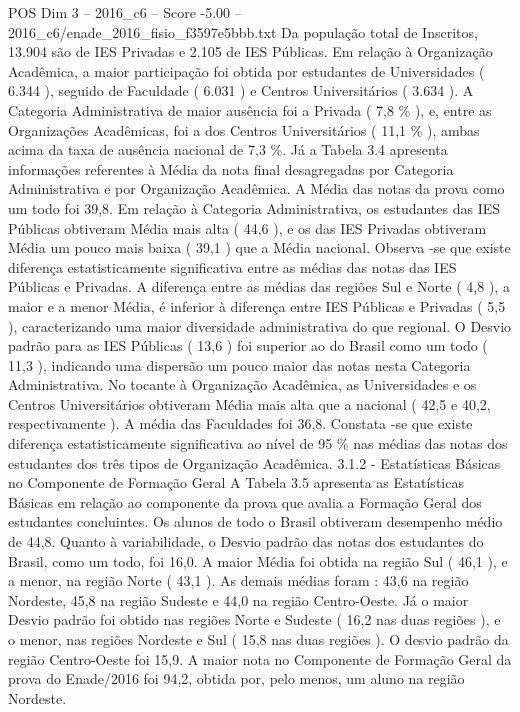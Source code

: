 \begin{textsample}{POS Dim 3 – 2016\_c6 – Score -5.00 – 2016\_c6/enade\_2016\_fisio\_f3597e5bbb.txt}
Da população total de Inscritos, 13.904 são de IES Privadas e 2.105 de IES Públicas.
Em relação à Organização Acadêmica, a maior participação foi obtida por estudantes de Universidades ( 6.344 ), seguido de Faculdade ( 6.031 ) e Centros Universitários ( 3.634 ).
A Categoria Administrativa de maior ausência foi a Privada ( 7,8 \% ), e, entre as Organizações Acadêmicas, foi a dos Centros Universitários ( 11,1 \% ), ambas acima da taxa de ausência nacional de 7,3 \%.
Já a Tabela 3.4 apresenta informações referentes à Média da nota final desagregadas por Categoria Administrativa e por Organização Acadêmica.
A Média das notas da prova como um todo foi 39,8.
Em relação à Categoria Administrativa, os estudantes das IES Públicas obtiveram Média mais alta ( 44,6 ), e os das IES Privadas obtiveram Média um pouco mais baixa ( 39,1 ) que a Média nacional.
Observa -se que existe diferença estatisticamente significativa entre as médias das notas das IES Públicas e Privadas.
A diferença entre as médias das regiões Sul e Norte ( 4,8 ), a maior e a menor Média, é inferior à diferença entre IES Públicas e Privadas ( 5,5 ), caracterizando uma maior diversidade administrativa do que regional.
O Desvio padrão para as IES Públicas ( 13,6 ) foi superior ao do Brasil como um todo ( 11,3 ), indicando uma dispersão um pouco maior das notas nesta Categoria Administrativa.
No tocante à Organização Acadêmica, as Universidades e os Centros Universitários obtiveram Média mais alta que a nacional ( 42,5 e 40,2, respectivamente ).
A média das Faculdades foi 36,8.
Constata -se que existe diferença estatisticamente significativa ao nível de 95 \% nas médias das notas dos estudantes dos três tipos de Organização Acadêmica. 3.1.2 - Estatísticas Básicas no Componente de Formação Geral A Tabela 3.5 apresenta as Estatísticas Básicas em relação ao componente da prova que avalia a Formação Geral dos estudantes concluintes.
Os alunos de todo o Brasil obtiveram desempenho médio de 44,8.
Quanto à variabilidade, o Desvio padrão das notas dos estudantes do Brasil, como um todo, foi 16,0.
A maior Média foi obtida na região Sul ( 46,1 ), e a menor, na região Norte ( 43,1 ).
As demais médias foram : 43,6 na região Nordeste, 45,8 na região Sudeste e 44,0 na região Centro-Oeste.
Já o maior Desvio padrão foi obtido nas regiões Norte e Sudeste ( 16,2 nas duas regiões ), e o menor, nas regiões Nordeste e Sul ( 15,8 nas duas regiões ).
O desvio padrão da região Centro-Oeste foi 15,9.
A maior nota no Componente de Formação Geral da prova do Enade/2016 foi 94,2, obtida por, pelo menos, um aluno na região Nordeste.

\end{textsample}
